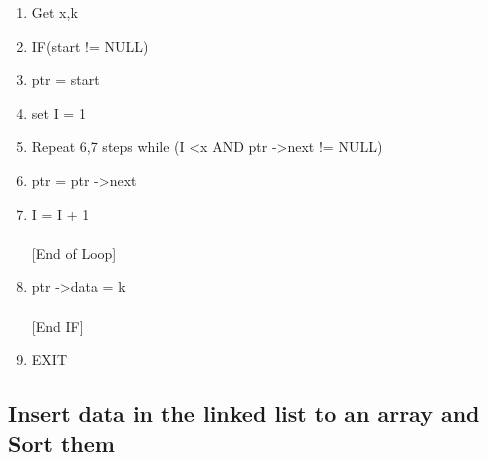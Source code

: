 \documentclass[a4paper,12pt]{article}
\begin{document}
\begin{enumerate}[Step 1:]

\item Get x,k

\item IF(start != NULL)
\item \hspace*{5mm} ptr = start 
\item  \hspace*{5mm} set I = 1
\item  \hspace*{5mm}Repeat 6,7 steps  while (I \textless x  AND  ptr -\textgreater  next != NULL)
\item  \hspace*{15mm} ptr = ptr -\textgreater  next
\item  \hspace*{15mm} I = I + 1\\
\\ \hspace*{5mm} [End of Loop]
\item \hspace*{5mm} ptr -\textgreater  data = k\\
\\  \hspace*{1mm} [End IF]
\item EXIT

\end{enumerate}





\subsection*{Insert data in the linked list to an array and Sort them}
\end{document}

